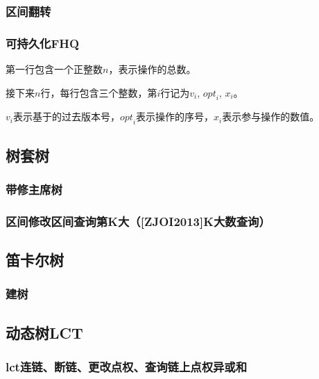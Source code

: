 \documentclass[twoside,a4paper]{article}
\begin{document}
\subsubsection{区间翻转}


\subsubsection{可持久化FHQ}
第一行包含一个正整数$n$，表示操作的总数。\par
接下来$n$行，每行包含三个整数，第$i$行记为${v}_{i}$, ${opt}_i$, $x_i$。\par
$v_i$表示基于的过去版本号，${opt}_i$表示操作的序号，$x_i$表示参与操作的数值。



\subsection{树套树}

\subsubsection{带修主席树}


\subsubsection{区间修改区间查询第K大（[ZJOI2013]K大数查询）}


\subsection{笛卡尔树}
\subsubsection{建树}



\subsection{动态树LCT}

\subsubsection{lct连链、断链、更改点权、查询链上点权异或和}

\end{document}
